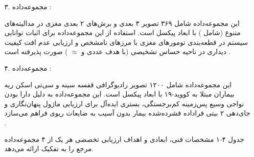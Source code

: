 

۳. مجموعه‌داده  :\par

این مجموعه‌داده شامل ۳۶۹ تصویر ۳ بعدی و برش‌های ۲ بعدی  مغزی در مدالیته‌های متنوع (شامل ) با ابعاد  پیکسل است. استفاده از این مجموعه‌داده برای اثبات توانایی سیستم در قطعه‌بندی تومورهای مغزی با مرزهای نامشخص و ارزیابی عدم افت کیفیت دیداری در ناحیه حساس تشخیصی (با هدف عددی  و  \ensuremath{\approx} ) صورت پذیرفته است .\par



۴. مجموعه‌داده  :\par

این مجموعه‌داده شامل ۱۲۰۰ تصویر رادیوگرافی قفسه سینه  و سی‌تی اسکن ریه بیماران مبتلا به کووید{-}۱۹ با ابعاد  پیکسل است. این مجموعه‌داده به دلیل دارا بودن نواحی وسیع پس‌زمینه کم‌برجستگی، بستری ایده‌آل برای ارزیابی ماژول پنهان‌نگاری  و جای‌دهی ۲ بیتی  فراداده فشرده‌شده  بیمار بدون آسیب به ضایعات ریوی فراهم می‌سازد .\par



جدول ۴{-}۱ مشخصات فنی، ابعادی و اهداف ارزیابی تخصصی هر یک از ۴ مجموعه‌داده مرجع را به تفکیک ارائه می‌دهد.\par



